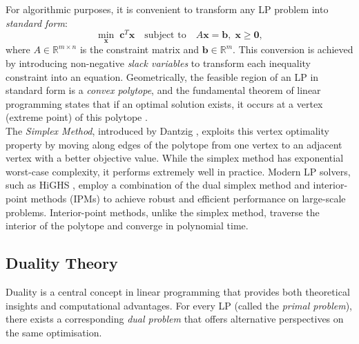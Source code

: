 \documentclass[openany]{book}
\numberwithin{figure}{chapter}
\numberwithin{equation}{chapter}
\begin{document}
For algorithmic purposes, it is convenient to transform any LP problem into \textit{standard form}:
\begin{equation}
\min_{\mathbf{x}} \; \mathbf{c}^T\mathbf{x} \quad \text{subject to} \quad A\mathbf{x} = \mathbf{b}, \; \mathbf{x} \geq \mathbf{0},
\label{eq:lp_standard}
\end{equation}
where $A \in \mathbb{R}^{m \times n}$ is the constraint matrix and $\mathbf{b} \in \mathbb{R}^{m}$. This conversion is achieved by introducing non-negative \textit{slack variables} to transform each inequality constraint into an equation. Geometrically, the feasible region of an LP in standard form is a \textit{convex polytope}, and the fundamental theorem of linear programming states that if an optimal solution exists, it occurs at a vertex (extreme point) of this polytope \cite{bertsimas1997}.\\

The \textit{Simplex Method}, introduced by Dantzig \cite{dantzig1947}, exploits this vertex optimality property by moving along edges of the polytope from one vertex to an adjacent vertex with a better objective value. While the simplex method has exponential worst-case complexity, it performs extremely well in practice. Modern LP solvers, such as HiGHS \cite{huangfu2018}, employ a combination of the dual simplex method and interior-point methods (IPMs) to achieve robust and efficient performance on large-scale problems. Interior-point methods, unlike the simplex method, traverse the interior of the polytope and converge in polynomial time.

\subsection{Duality Theory}

Duality is a central concept in linear programming that provides both theoretical insights and computational advantages. For every LP (called the \textit{primal problem}), there exists a corresponding \textit{dual problem} that offers alternative perspectives on the same optimisation.\\
\end{document}
